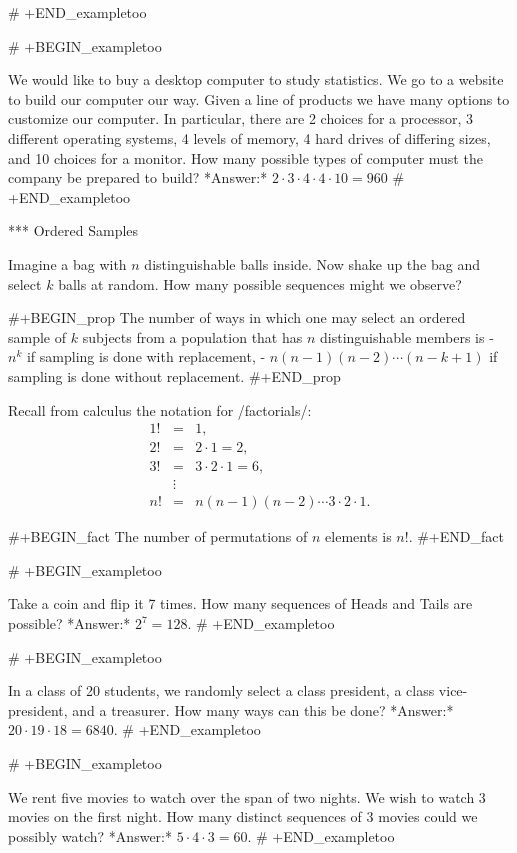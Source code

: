 # +END_exampletoo


# +BEGIN_exampletoo

We would like to buy a desktop computer to study statistics. We go to
a website to build our computer our way. Given a line of products we
have many options to customize our computer. In particular, there are
2 choices for a processor, 3 different operating systems, 4 levels of
memory, 4 hard drives of differing sizes, and 10 choices for a
monitor. How many possible types of computer must the company be
prepared to build? *Answer:* \(2 \cdot 3 \cdot 4 \cdot 4 \cdot 10 = 960\)
# +END_exampletoo

*** Ordered Samples

Imagine a bag with \(n\) distinguishable balls inside. Now shake up
the bag and select \(k\) balls at random. How many possible sequences
might we observe?

#+BEGIN_prop
The number of ways in which one may select an ordered sample of \(k\)
subjects from a population that has \(n\) distinguishable members is
- \(n^{k}\) if sampling is done with replacement,
- \(n(n-1)(n-2)\cdots(n-k+1)\) if sampling is done without
  replacement.
#+END_prop

Recall from calculus the notation for /factorials/: 
\begin{eqnarray*}
1! & = & 1,\\
2! & = & 2 \cdot 1 = 2,\\
3! & = & 3 \cdot 2 \cdot 1 = 6,\\
 & \vdots\\
n! & = & n(n - 1)(n - 2) \cdots 3 \cdot 2 \cdot 1.
\end{eqnarray*}

#+BEGIN_fact
The number of permutations of \(n\) elements is \(n!\).
#+END_fact

# +BEGIN_exampletoo

Take a coin and flip it 7 times. How many sequences of Heads and Tails
are possible? *Answer:* \(2^{7}=128\).
# +END_exampletoo


# +BEGIN_exampletoo

In a class of 20 students, we randomly select a class president, a
class vice-president, and a treasurer. How many ways can this be
done? *Answer:* \(20\cdot19\cdot18=6840\).
# +END_exampletoo


# +BEGIN_exampletoo

We rent five movies to watch over the span of two nights. We wish to
watch 3 movies on the first night. How many distinct sequences of 3
movies could we possibly watch? *Answer:* \(5\cdot4\cdot3=60\).
# +END_exampletoo


